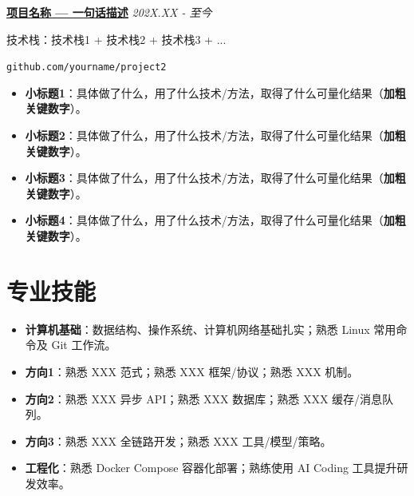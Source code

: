 \documentclass[10pt, a4paper]{article}
\newcommand{\projectTitle}[2]{\noindent\textbf{#1} \hfill \textit{#2}\par\vspace{1pt}}
\newcommand{\projectTech}[1]{\noindent\textcolor{secondary}{\small 技术栈：#1}\par\vspace{1pt}}
\begin{document}
\vspace{1pt}

\projectTitle{\href{https://github.com/yourname/project2}{项目名称 — 一句话描述}}{202X.XX - 至今}
\projectTech{技术栈1 + 技术栈2 + 技术栈3 + ...}
\noindent\textcolor{secondary}{\small \texttt{github.com/yourname/project2}}\par\vspace{1pt}
\begin{itemize}
    \item \textbf{小标题1}：具体做了什么，用了什么技术/方法，取得了什么可量化结果（\textbf{加粗关键数字}）。
    \item \textbf{小标题2}：具体做了什么，用了什么技术/方法，取得了什么可量化结果（\textbf{加粗关键数字}）。
    \item \textbf{小标题3}：具体做了什么，用了什么技术/方法，取得了什么可量化结果（\textbf{加粗关键数字}）。
    \item \textbf{小标题4}：具体做了什么，用了什么技术/方法，取得了什么可量化结果（\textbf{加粗关键数字}）。
\end{itemize}

\section*{专业技能}
\begin{itemize}
    \item \textbf{计算机基础}：数据结构、操作系统、计算机网络基础扎实；熟悉 Linux 常用命令及 Git 工作流。
    \item \textbf{方向1}：熟悉 XXX 范式；熟悉 XXX 框架/协议；熟悉 XXX 机制。
    \item \textbf{方向2}：熟悉 XXX 异步 API；熟悉 XXX 数据库；熟悉 XXX 缓存/消息队列。
    \item \textbf{方向3}：熟悉 XXX 全链路开发；熟悉 XXX 工具/模型/策略。
    \item \textbf{工程化}：熟悉 Docker Compose 容器化部署；熟练使用 AI Coding 工具提升研发效率。
\end{itemize}
\end{document}
